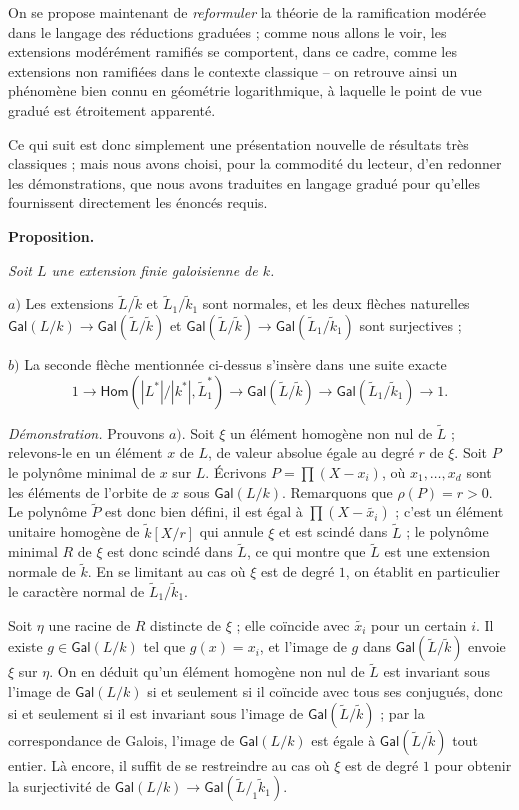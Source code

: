 \documentclass[10pt,leqno]{article}
\newcommand{\red}{\widetilde}
\newcommand{\deux}[1]{\refstepcounter{subsection}\label{#1}\medskip\noindent {\bf (\thesubsection)}\hspace{.1cm}}
\begin{document}
\medskip
On se propose maintenant de {\em reformuler} la théorie de la ramification modérée dans le langage des réductions graduées ; comme nous allons le voir, les extensions modérément ramifiés se comportent, dans ce cadre, comme les extensions non ramifiées dans le contexte classique -- on retrouve ainsi un phénomène bien connu en géométrie logarithmique, à laquelle le point de vue gradué est étroitement apparenté. 

\medskip
Ce qui suit est donc simplement une présentation nouvelle de résultats très classiques ; mais nous avons choisi, pour la commodité du lecteur, d'en redonner les démonstrations, que nous avons traduites en langage gradué pour qu'elles fournissent directement les énoncés requis. 


\medskip
\deux{redquasigal} {\bf Proposition.} {\em Soit $L$ une extension finie galoisienne de $k$. 

\medskip
$a)$ Les extensions $\red{L}/\red{k}$ et $\red{L}_1/\red{k}_1$ sont normales, et les deux flèches naturelles $\mathsf {Gal}(L/k)\to \mathsf{Gal}(\red{L}/\red{k})$ et $\mathsf{Gal}(\red{L}/\red{k})\to\mathsf{Gal}(\red{L}_1/\red{k}_1)$ sont surjectives ;

\medskip
$b)$ La seconde flèche mentionnée ci-dessus s'insère dans une suite exacte $$1\to\mathsf{Hom}(|L^{*}|/|k^{*}|,\red{L}_1^{*})\to\mathsf {Gal}(\red{L}/\red{k})\to\mathsf {Gal}(\red{L}_1/\red{k}_1)\to 1. $$} 

\medskip
{\em Démonstration.} Prouvons $a)$. Soit $\xi$ un élément homogène non nul de $\red{L}$ ; relevons-le en un élément $x$ de $L$, de valeur absolue égale au degré $r$ de $\xi$. Soit $P$ le polynôme minimal de $x$ sur $L$. Écrivons $P=\prod (X-x_{i})$, où $x_{1},\ldots,x_{d}$ sont les éléments de l'orbite de $x$ sous $\mathsf {Gal}(L/k)$. Remarquons que $\rho(P)=r>0$. Le polynôme $\red{P}$ est donc bien défini, il est égal à $\prod (X-\red{x_{i}})$ ; c'est un élément unitaire homogène de $\red{k}[X/r]$ qui annule $\xi$ et est scindé dans $\red{L}$ ; le polynôme minimal $R$ de $\xi$ est donc scindé dans $\red{L}$, ce qui montre que $\red{L}$ est une extension normale de $\red k$. En se limitant au cas où $\xi$ est de degré $1$, on établit en particulier le caractère normal de $\red{L}_1/\red{k}_1$. 

\medskip
Soit $\eta$ une racine de $R$ distincte de $\xi$ ; elle coïncide avec $\red{x_{i}}$ pour un certain $i$. Il existe $g\in \mathsf {Gal}(L/k)$ tel que $g(x)=x_{i}$, et l'image de $g$ dans $\mathsf{Gal} (\red{L}/\red{k})$ envoie $\xi$ sur $\eta$. On en déduit qu'un élément homogène non nul de $\red{L}$ est invariant sous l'image de $\mathsf {Gal}(L/k)$ si et seulement si il coïncide avec tous ses conjugués, donc si et seulement si il est invariant sous l'image de $\mathsf{Gal} (\red{L}/\red{k})$ ; par la correspondance de Galois, l'image de $\mathsf {Gal}(L/k)$ est égale à $\mathsf{Gal} (\red{L}/\red{k})$ tout entier. Là encore, il suffit de se restreindre au cas où $\xi$ est de degré $1$ pour obtenir la surjectivité de $\mathsf {Gal}(L/k)\to \mathsf{Gal}(\red{L}/_1\red{k}_1)$.
\end{document}

